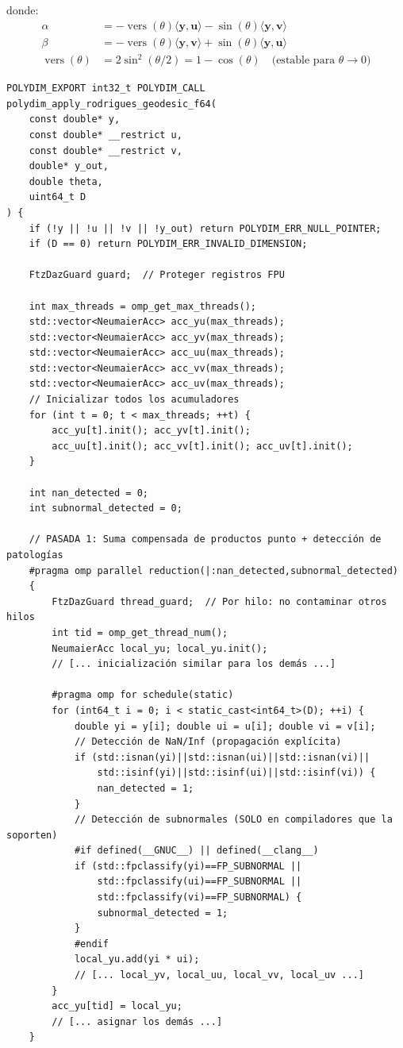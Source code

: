 donde:
\begin{align}
\alpha &= -\operatorname{vers}(\theta)\langle\mathbf{y}, \mathbf{u}\rangle - \sin(\theta)\langle\mathbf{y}, \mathbf{v}\rangle \\
\beta  &= -\operatorname{vers}(\theta)\langle\mathbf{y}, \mathbf{v}\rangle + \sin(\theta)\langle\mathbf{y}, \mathbf{u}\rangle \\
\operatorname{vers}(\theta) &= 2\sin^2(\theta/2) = 1 - \cos(\theta) \quad \text{(estable para } \theta \to 0\text{)}
\end{align}

\begin{verbatim}
POLYDIM_EXPORT int32_t POLYDIM_CALL 
polydim_apply_rodrigues_geodesic_f64(
    const double* y,
    const double* __restrict u,
    const double* __restrict v,
    double* y_out,
    double theta,
    uint64_t D
) {
    if (!y || !u || !v || !y_out) return POLYDIM_ERR_NULL_POINTER;
    if (D == 0) return POLYDIM_ERR_INVALID_DIMENSION;

    FtzDazGuard guard;  // Proteger registros FPU

    int max_threads = omp_get_max_threads();
    std::vector<NeumaierAcc> acc_yu(max_threads);
    std::vector<NeumaierAcc> acc_yv(max_threads);
    std::vector<NeumaierAcc> acc_uu(max_threads);
    std::vector<NeumaierAcc> acc_vv(max_threads);
    std::vector<NeumaierAcc> acc_uv(max_threads);
    // Inicializar todos los acumuladores
    for (int t = 0; t < max_threads; ++t) {
        acc_yu[t].init(); acc_yv[t].init();
        acc_uu[t].init(); acc_vv[t].init(); acc_uv[t].init();
    }

    int nan_detected = 0;
    int subnormal_detected = 0;

    // PASADA 1: Suma compensada de productos punto + detección de patologías
    #pragma omp parallel reduction(|:nan_detected,subnormal_detected)
    {
        FtzDazGuard thread_guard;  // Por hilo: no contaminar otros hilos
        int tid = omp_get_thread_num();
        NeumaierAcc local_yu; local_yu.init();
        // [... inicialización similar para los demás ...]

        #pragma omp for schedule(static)
        for (int64_t i = 0; i < static_cast<int64_t>(D); ++i) {
            double yi = y[i]; double ui = u[i]; double vi = v[i];
            // Detección de NaN/Inf (propagación explícita)
            if (std::isnan(yi)||std::isnan(ui)||std::isnan(vi)||
                std::isinf(yi)||std::isinf(ui)||std::isinf(vi)) {
                nan_detected = 1;
            }
            // Detección de subnormales (SOLO en compiladores que la soporten)
            #if defined(__GNUC__) || defined(__clang__)
            if (std::fpclassify(yi)==FP_SUBNORMAL ||
                std::fpclassify(ui)==FP_SUBNORMAL ||
                std::fpclassify(vi)==FP_SUBNORMAL) {
                subnormal_detected = 1;
            }
            #endif
            local_yu.add(yi * ui);
            // [... local_yv, local_uu, local_vv, local_uv ...]
        }
        acc_yu[tid] = local_yu;
        // [... asignar los demás ...]
    }


\end{verbatim}
